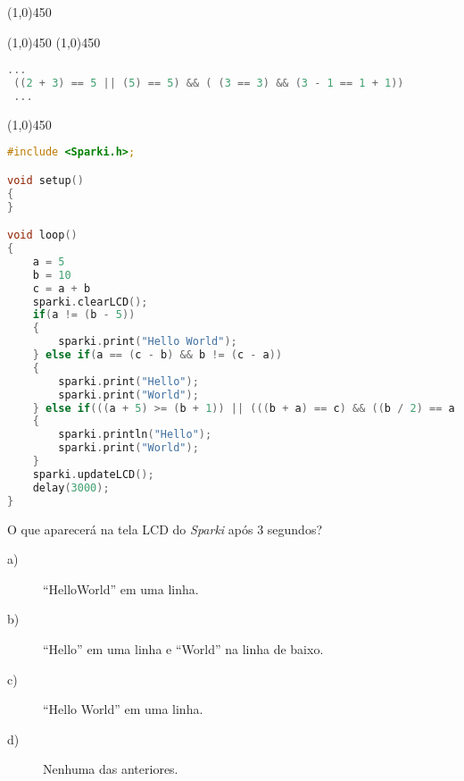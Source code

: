     \begin{center}
        \line(1,0){450}
        \vspace{0.4cm} 
    \end{center}


    \begin{center}
        \line(1,0){450}
        \vspace{0.2cm}   
        \line(1,0){450}
        \vspace{0.4cm} 
    \end{center}


    \begin{lstlisting}[language=C]
 ...
 ((2 + 3) == 5 || (5) == 5) && ( (3 == 3) && (3 - 1 == 1 + 1))
 ...
\end{lstlisting}

    \begin{center}
        \line(1,0){450}
        \vspace{0.4cm} 
    \end{center}
 

    \begin{lstlisting}[language=C]
#include <Sparki.h>;

void setup()
{
}

void loop()
{
    a = 5
    b = 10
    c = a + b
    sparki.clearLCD();
    if(a != (b - 5)) 
    {
        sparki.print("Hello World");
    } else if(a == (c - b) && b != (c - a)) 
    {
        sparki.print("Hello");
        sparki.print("World");
    } else if(((a + 5) >= (b + 1)) || (((b + a) == c) && ((b / 2) == a))) 
    {
        sparki.println("Hello");
        sparki.print("World");
    }
    sparki.updateLCD();
    delay(3000);
}
\end{lstlisting}
    
    O que aparecerá na tela LCD do \textsl{Sparki} após 3 segundos?

    \begin{description}
    \item[a)] ``HelloWorld'' em uma linha.
    \item[b)] ``Hello'' em uma linha e ``World'' na linha de baixo.
    \item[c)] ``Hello World'' em uma linha.
    \item[d)] Nenhuma das anteriores.
    \end{description}

